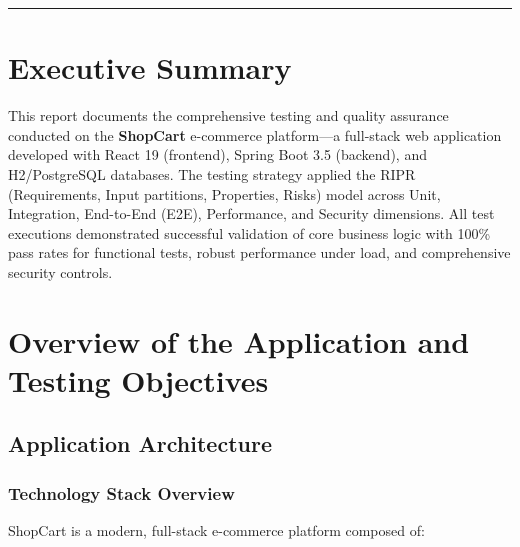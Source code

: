 \documentclass[11pt,a4paper]{article}
\begin{document}
\tableofcontents
\vspace{1cm}
\hrule
\vspace{1cm}

\section*{Executive Summary}

This report documents the comprehensive testing and quality assurance conducted on the \textbf{ShopCart} e-commerce platform—a full-stack web application developed with React 19 (frontend), Spring Boot 3.5 (backend), and H2/PostgreSQL databases. The testing strategy applied the RIPR (Requirements, Input partitions, Properties, Risks) model across Unit, Integration, End-to-End (E2E), Performance, and Security dimensions. All test executions demonstrated successful validation of core business logic with 100\% pass rates for functional tests, robust performance under load, and comprehensive security controls.

\section{Overview of the Application and Testing Objectives}

\subsection{Application Architecture}

\subsubsection{Technology Stack Overview}

ShopCart is a modern, full-stack e-commerce platform composed of:
\end{document}
